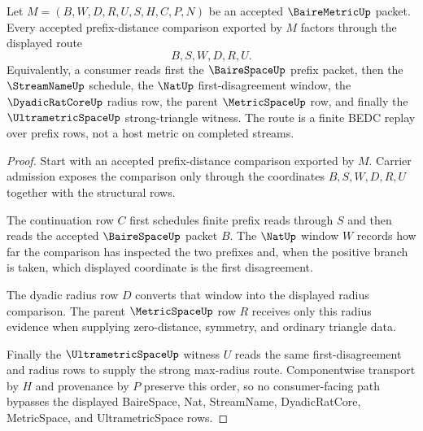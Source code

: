 \begin{theorem}
\label{thm:bairemetric-ultrametric-prefix-route}
Let $M=(B,W,D,R,U,S,H,C,P,N)$ be an accepted $\BaireMetricUp$ packet. Every accepted prefix-distance comparison exported by $M$ factors through the displayed route
$$
B,S,W,D,R,U .
$$
Equivalently, a consumer reads first the $\BaireSpaceUp$ prefix packet, then the $\StreamNameUp$ schedule, the $\NatUp$ first-disagreement window, the $\DyadicRatCoreUp$ radius row, the parent $\MetricSpaceUp$ row, and finally the $\UltrametricSpaceUp$ strong-triangle witness. The route is a finite BEDC replay over prefix rows, not a host metric on completed streams.
\end{theorem}
\begin{proof}
Start with an accepted prefix-distance comparison exported by $M$. Carrier admission exposes the comparison only through the coordinates $B,S,W,D,R,U$ together with the structural rows.

The continuation row $C$ first schedules finite prefix reads through $S$ and then reads the accepted $\BaireSpaceUp$ packet $B$. The $\NatUp$ window $W$ records how far the comparison has inspected the two prefixes and, when the positive branch is taken, which displayed coordinate is the first disagreement.

The dyadic radius row $D$ converts that window into the displayed radius comparison. The parent $\MetricSpaceUp$ row $R$ receives only this radius evidence when supplying zero-distance, symmetry, and ordinary triangle data.

Finally the $\UltrametricSpaceUp$ witness $U$ reads the same first-disagreement and radius rows to supply the strong max-radius route. Componentwise transport by $H$ and provenance by $P$ preserve this order, so no consumer-facing path bypasses the displayed BaireSpace, Nat, StreamName, DyadicRatCore, MetricSpace, and UltrametricSpace rows.
\end{proof}

